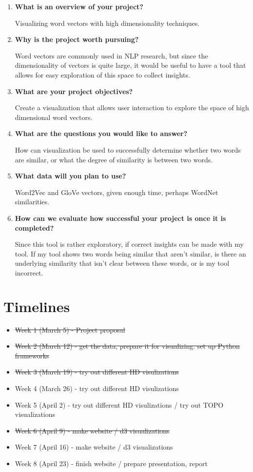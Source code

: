 \documentclass{article}
\begin{document}
\begin{enumerate}
	\item \textbf{What is an overview of your project?}
	
	Visualizing word vectors with high dimensionality techniques. 
	
	\item \textbf{Why is the project worth pursuing?}
	
	Word vectors are commonly used in NLP research, but since the dimensionality of vectors is quite large, it would be useful to have a tool that allows for easy exploration of this space to collect insights. 
	
	\item \textbf{What are your project objectives?}
	
	Create a visualization that allows user interaction to explore the space of high dimensional word vectors. 
	
	\item \textbf{What are the questions you would like to answer?}
	
	How can visualization be used to successfully determine whether two words are similar, or what the degree of similarity is between two words. 
	
	\item \textbf{What data will you plan to use?}
	
	Word2Vec and GloVe vectors, given enough time, perhaps WordNet similarities. 
	
	\item \textbf{How can we evaluate how successful your project is once it is completed?}
	
	Since this tool is rather exploratory, if correct insights can be made with my tool. If my tool shows two words being similar that aren't similar, is there an underlying similarity that isn't clear between these words, or is my tool incorrect. 
\end{enumerate}




\section{Timelines}

\begin{itemize}
\item \sout{Week 1 (March 5) - Project proposal}
\item \sout{Week 2 (March 12) - get the data, prepare it for visualizing. set up Python frameworks}
\item \sout{Week 3 (March 19) - try out different HD visulizations}
\item Week 4 (March 26) - try out different HD visulizations
\item Week 5 (April 2) - try out different HD visulizations / try out TOPO visualizations
\item \sout{Week 6 (April 9) - make website / d3 visualizations}
\item Week 7 (April 16) - make website / d3 visualizations
\item Week 8 (April 23) - finish website / prepare presentation, report
\end{itemize}
\end{document}
